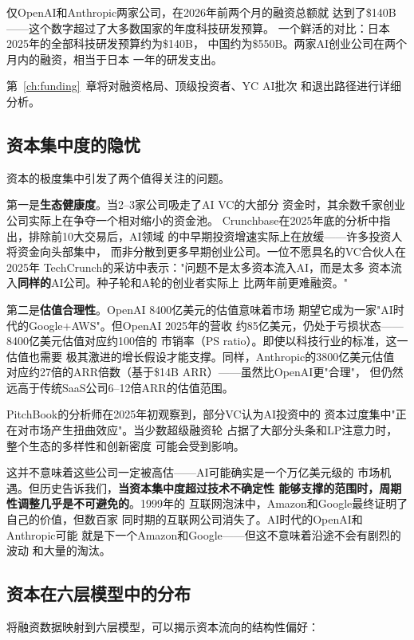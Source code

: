 仅OpenAI和Anthropic两家公司，在2026年前两个月的融资总额就
达到了\$140B——这个数字超过了大多数国家的年度科技研发预算。
一个鲜活的对比：日本2025年的全部科技研发预算约为\$140B，
中国约为\$550B。两家AI创业公司在两个月内的融资，相当于日本
一年的研发支出。

第~\ref{ch:funding}~章将对融资格局、顶级投资者、YC AI批次
和退出路径进行详细分析。

\subsection{资本集中度的隐忧}

资本的极度集中引发了两个值得关注的问题。

第一是\textbf{生态健康度}。当2--3家公司吸走了AI VC的大部分
资金时，其余数千家创业公司实际上在争夺一个相对缩小的资金池。
Crunchbase在2025年底的分析中指出，排除前10大交易后，AI领域
的中早期投资增速实际上在放缓——许多投资人将资金向头部集中，
而非分散到更多早期创业公司。一位不愿具名的VC合伙人在2025年
TechCrunch的采访中表示："问题不是太多资本流入AI，而是太多
资本流入\textbf{同样的}AI公司。种子轮和A轮的创业者实际上
比两年前更难融资。"

第二是\textbf{估值合理性}。OpenAI 8400亿美元的估值意味着市场
期望它成为一家"AI时代的Google+AWS"。但OpenAI 2025年的营收
约85亿美元，仍处于亏损状态——8400亿美元估值对应约100倍的
市销率（PS ratio）。即使以科技行业的标准，这一估值也需要
极其激进的增长假设才能支撑。同样，Anthropic的3800亿美元估值
对应约27倍的ARR倍数（基于\$14B ARR）——虽然比OpenAI更"合理"，
但仍然远高于传统SaaS公司6--12倍ARR的估值范围。

PitchBook的分析师在2025年初观察到，部分VC认为AI投资中的
资本过度集中"正在对市场产生扭曲效应"。当少数超级融资轮
占据了大部分头条和LP注意力时，整个生态的多样性和创新密度
可能会受到影响。

这并不意味着这些公司一定被高估——AI可能确实是一个万亿美元级的
市场机遇。但历史告诉我们，\textbf{当资本集中度超过技术不确定性
能够支撑的范围时，周期性调整几乎是不可避免的}。1999年的
互联网泡沫中，Amazon和Google最终证明了自己的价值，但数百家
同时期的互联网公司消失了。AI时代的OpenAI和Anthropic可能
就是下一个Amazon和Google——但这不意味着沿途不会有剧烈的波动
和大量的淘汰。

\subsection{资本在六层模型中的分布}

将融资数据映射到六层模型，可以揭示资本流向的结构性偏好：

